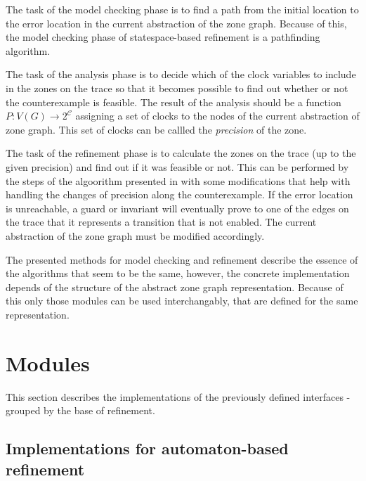 The task of the model checking phase is to find a path from the initial location to the error location in the current abstraction of the zone graph. Because of this, the model checking phase of statespace-based refinement is a pathfinding algorithm.

The task of the analysis phase is to decide which of the clock variables to include in the zones on the trace so that it becomes possible to find out whether or not the counterexample is feasible. The result of the analysis should be a function $P: V(G) \to 2^\mathcal{C}$ assigning a set of clocks to the nodes of the current abstraction of zone graph. This set of clocks can be callled the \emph{precision} of the zone.

The task of the refinement phase is to calculate the zones on the trace (up to the given precision) and find out if it was feasible or not. This can be performed by the steps of the algoorithm presented in  with some modifications that help with handling the changes of precision along the counterexample. If the error location is unreachable, a guard or invariant will eventually prove to one of the edges on the trace that it represents a transition that is not enabled. The current abstraction of the zone graph must be modified accordingly.


The presented methods for model checking and refinement describe the essence of the algorithms that seem to be the same, however, the concrete implementation depends of the structure of the abstract zone graph representation. Because of this only those modules can be used interchangably, that are defined for the same representation.


\section{Modules}

This section describes the implementations of the previously defined interfaces - grouped by the base of refinement.

\subsection{Implementations for automaton-based refinement}


